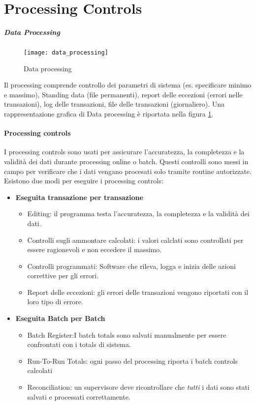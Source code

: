 \section{Processing Controls}

\subparagraph{Data Processing}

\begin{figure}[h!]
        \begin{center}
                \texttt{[image: data\_processing]}
        \end{center}
        \caption{Data processing}
        \label{fig:data:processing}
\end{figure}

Il processing comprende controllo dei parametri di sistema (es. specificare
minimo e massimo), Standing data (file permanenti), report delle eccezioni
(errori nelle transazioni), log delle transazioni, file delle transazioni
(giornaliero). Una rappresentazione grafica di Data processing è riportata
nella figura \ref{fig:data:processing}.

\paragraph{Processing controls}
I processing controls sono usati per assicurare
l'accuratezza, la completezza e la validità dei dati durante
processing online o batch. Questi controlli sono messi in campo
per verificare che i dati vengano procesati solo tramite routine
autorizzate. Esistono due modi per eseguire i processing controls:

\begin{itemize}
\item \textbf{Eseguita transazione per transazione}
\begin{itemize}
\item Editing: il programma testa l'accuratezza, la completezza
e la validità dei dati.
\item Controlli sugli ammontare calcolati: i valori calclati
sono controllati per essere ragionevoli e non eccedere il massimo.
\item Controlli programmati: Software che rileva, logga e inizia
delle azioni correttive per gli errori.
\item Report delle eccezioni: gli errori delle transazioni vengono
riportati con il loro tipo di errore.
\end{itemize}

\item \textbf{Eseguita Batch per Batch}

\begin{itemize}
\item Batch Register:I batch totals sono salvati manualmente per essere
confrontati con i totals di sistema. 
\item Run-To-Run Totals: ogni passo del processing riporta i batch
controls calcolati
\item Reconciliation: un supervisore deve ricontrollare che \emph{tutti}
i dati sono stati salvati e processati correttamente.
\end{itemize}
\end{itemize}


